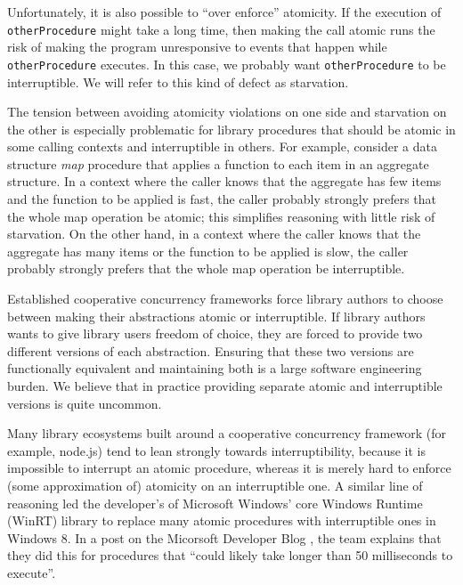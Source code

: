 \documentclass[9pt,preprint]{sigplanconf}
\begin{document}
Unfortunately, it is also possible to ``over enforce'' atomicity.
If the execution of \texttt{otherProcedure} might take a long time\footnotemark{}, then making the call atomic runs the risk of making the program unresponsive to events that happen while \texttt{otherProcedure} executes.
In this case, we probably want \texttt{otherProcedure} to be interruptible.
We will refer to this kind of defect as starvation.


The tension between avoiding atomicity violations on one side and starvation on the other is especially problematic for library procedures that should be atomic in some calling contexts and interruptible in others.
For example, consider a data structure \emph{map} procedure that applies a function to each item in an aggregate structure.
In a context where the caller knows that the aggregate has few items and the function to be applied is fast, the caller probably strongly prefers that the whole map operation be atomic; this simplifies reasoning with little risk of starvation.
On the other hand, in a context where the caller knows that the aggregate has many items or the function to be applied is slow, the caller probably strongly prefers that the whole map operation be interruptible.

Established cooperative concurrency frameworks force library authors to choose between making their abstractions atomic or interruptible.
If library authors wants to give library users freedom of choice, they are forced to provide two different versions of each abstraction.
Ensuring that these two versions are functionally equivalent and maintaining both is a large software engineering burden.
We believe that in practice providing separate atomic and interruptible versions is quite uncommon.

Many library ecosystems built around a cooperative concurrency framework (for example, node.js) tend to lean strongly towards interruptibility, because it is impossible to interrupt an atomic procedure, whereas it is merely hard to enforce (some approximation of) atomicity on an interruptible one.
A similar line of reasoning led the developer's of Microsoft Windows' core Windows Runtime (WinRT) library to replace many atomic procedures with interruptible ones in Windows 8.
In a post on the Micorsoft Developer Blog \cite{Windows8Team2012}, the team explains that they did this for procedures that ``could likely take longer than 50 milliseconds to execute''.
\end{document}

